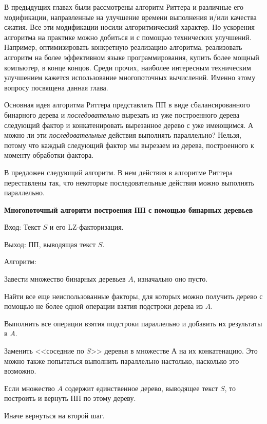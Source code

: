 \documentclass[14pt]{article}
\begin{document}
В предыдущих главах были рассмотрены алгоритм Риттера и различные его модификации, направленные на улучшение времени выполнения
и/или качества сжатия. Все эти модификации носили алгоритмический характер. Но ускорения алгоритма на практике можно добиться
и с помощью технических улучшений. Например, оптимизировать конкретную реализацию алгоритма, реализовать алгоритм на более
эффективном языке программирования, купить более мощный компьютер, в конце концов. Среди прочих, наиболее интересным
техническим улучшением кажется использование многопоточных вычислений. Именно этому вопросу посвящена данная глава.

Основная идея алгоритма Риттера представлять ПП в виде сбалансированного бинарного дерева и {\it последовательно}
вырезать из уже построенного дерева следующий фактор и конкатенировать вырезанное дерево с уже имеющимся.
А можно ли эти {\it последовательные} действия выполнять параллельно? Нельзя, потому что каждый следующий фактор
мы вырезаем из дерева, построенного к моменту обработки фактора.

В \cite{MasterPaper} предложен следующий алгоритм. В нем действия в алгоритме Риттера переставлены так, что
некоторые последовательные действия можно выполнять параллельно.

{\bf Многопоточный алгоритм построения ПП с помощью бинарных деревьев}

{\sc Вход:} Текст $S$ и его LZ-факторизация.

{\sc Выход:} ПП, выводящая текст $S$.

{\sc Алгоритм:}
\begin{enumerate}
	\begin{item}
		Завести множество бинарных деревьев $A$, изначально оно пусто.
	\end{item}
	\begin{item}
		Найти все еще неиспользованные факторы, для которых можно получить дерево с помощью не более 
		одной операции взятия подстроки дерева из $A$.
   	\end{item}
   	\begin{item}
   		Выполнить все операции взятия подстроки параллельно и добавить их результаты в $A$.
   	\end{item}
	\begin{item}
		Заменить <<соседние по $S$>> деревья в множестве $А$ на их конкатенацию. Это можно также попытаться
		выполнить параллельно настолько, насколько это возможно.
	\end{item}
	\begin{item}
		Если множество $A$ содержит единственное дерево, выводящее текст $S$, то построить и вернуть ПП по этому дереву.
	\end{item}
	\begin{item}
		Иначе вернуться на второй шаг.
	\end{item}
\end{enumerate}
\end{document}
